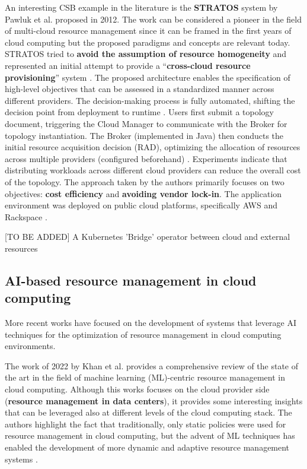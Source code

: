 An interesting CSB example in the literature is the \textbf{STRATOS} system by Pawluk et al. proposed in 2012. The work can be considered a pioneer in the field of multi-cloud resource management since it can be framed in the first years of cloud computing \cite{STRATOS} but the proposed paradigms and concepts are relevant today.
STRATOS tried to \textbf{avoid the assumption of resource homogeneity} and represented an initial attempt to provide a ``\textbf{cross-cloud resource provisioning}'' system \cite{STRATOS}.
The proposed architecture enables the specification of high-level objectives that can be assessed in a standardized manner across different providers. The decision-making process is fully automated, shifting the decision point from deployment to runtime \cite{STRATOS}.
Users first submit a topology document, triggering the Cloud Manager to communicate with the Broker for topology instantiation. The Broker (implemented in Java) then conducts the initial resource acquisition decision (RAD), optimizing the allocation of resources across multiple providers (configured beforehand) \cite{STRATOS}.
Experiments indicate that distributing workloads across different cloud providers can reduce the overall cost of the topology. The approach taken by the authors primarily focuses on two objectives: \textbf{cost efficiency} and \textbf{avoiding vendor lock-in}. The application environment was deployed on public cloud platforms, specifically AWS and Rackspace \cite{STRATOS}.
\newline

[TO BE ADDED]
A Kubernetes 'Bridge' operator between cloud and external resources

\subsection{AI-based resource management in cloud computing}
\label{sec:ai_based_resource_management}

More recent works have focused on the development of systems that leverage AI techniques for the optimization of resource management in cloud computing environments.

The work of 2022 by Khan et al. \cite{KHAN2022103405} provides a comprehensive review of the state of the art in the field of machine learning (ML)-centric resource management in cloud computing.
Although this works focuses on the cloud provider side (\textbf{resource management in data centers}), it provides some interesting insights that can be leveraged also at different levels of the cloud computing stack.
The authors highlight the fact that traditionally, only static policies were used for resource management in cloud computing, but the advent of ML techniques has enabled the development of more dynamic and adaptive resource management systems \cite{KHAN2022103405}. \newline

